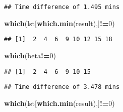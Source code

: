 \documentclass[]{ctexbook}
\newenvironment{Shaded}{\begin{snugshade}}{\end{snugshade}}
\newcommand{\CommentTok}[1]{\textcolor[rgb]{0.56,0.35,0.01}{\textit{#1}}}
\newcommand{\DataTypeTok}[1]{\textcolor[rgb]{0.13,0.29,0.53}{#1}}
\newcommand{\DecValTok}[1]{\textcolor[rgb]{0.00,0.00,0.81}{#1}}
\newcommand{\KeywordTok}[1]{\textcolor[rgb]{0.13,0.29,0.53}{\textbf{#1}}}
\newcommand{\NormalTok}[1]{#1}
\newcommand{\OperatorTok}[1]{\textcolor[rgb]{0.81,0.36,0.00}{\textbf{#1}}}
\newcommand{\StringTok}[1]{\textcolor[rgb]{0.31,0.60,0.02}{#1}}
\begin{document}
\begin{verbatim}
## Time difference of 1.495 mins
\end{verbatim}

\begin{Shaded}
\begin{Highlighting}[]
\KeywordTok{which}\NormalTok{(lst[}\KeywordTok{which.min}\NormalTok{(result),]}\OperatorTok{!=}\DecValTok{0}\NormalTok{)}
\end{Highlighting}
\end{Shaded}

\begin{verbatim}
## [1]  2  4  6  9 10 12 15 18
\end{verbatim}

\begin{Shaded}
\begin{Highlighting}[]
\KeywordTok{which}\NormalTok{(beta}\OperatorTok{!=}\DecValTok{0}\NormalTok{)}
\end{Highlighting}
\end{Shaded}

\begin{verbatim}
## [1]  2  4  6  9 10 15
\end{verbatim}

\begin{Shaded}
\end{Shaded}

\begin{verbatim}
## Time difference of 3.478 mins
\end{verbatim}

\begin{Shaded}
\begin{Highlighting}[]
\KeywordTok{which}\NormalTok{(lst[}\KeywordTok{which.min}\NormalTok{(result),]}\OperatorTok{!=}\DecValTok{0}\NormalTok{)}
\end{Highlighting}
\end{Shaded}
\end{document}
